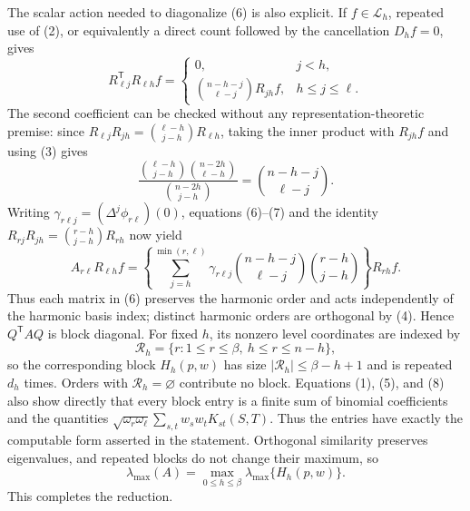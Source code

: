 The scalar action needed to diagonalize (6) is also explicit.  If \(f\in\mathcal L_h\), repeated use of (2), or equivalently a direct count followed by the cancellation \(D_hf=0\), gives
\[
R_{\ell j}^{\mathsf T}R_{\ell h}f
=\begin{cases}
0,&j<h,\\
\displaystyle\binom{n-h-j}{\ell-j}R_{jh}f,&h\le j\le\ell.
\end{cases}
\tag{7}
\]
The second coefficient can be checked without any representation-theoretic premise: since
\(R_{\ell j}R_{jh}=\binom{\ell-h}{j-h}R_{\ell h}\), taking the inner product with \(R_{jh}f\) and using (3) gives
\[
\frac{\binom{\ell-h}{j-h}\binom{n-2h}{\ell-h}}
{\binom{n-2h}{j-h}}
=\binom{n-h-j}{\ell-j}.
\]
Writing \(\gamma_{r\ell j}=(\Delta^j\phi_{r\ell})(0)\), equations (6)--(7) and the identity
\(R_{rj}R_{jh}=\binom{r-h}{j-h}R_{rh}\) now yield
\[
A_{r\ell}R_{\ell h}f
=\left\{
\sum_{j=h}^{\min(r,\ell)}
\gamma_{r\ell j}
\binom{n-h-j}{\ell-j}
\binom{r-h}{j-h}
\right\}R_{rh}f.
\tag{8}
\]
Thus each matrix in (6) preserves the harmonic order and acts independently of the harmonic basis index; distinct harmonic orders are orthogonal by (4).  Hence \(Q^{\mathsf T}AQ\) is block diagonal.  For fixed \(h\), its nonzero level coordinates are indexed by
\[
\mathcal R_h=\{r:1\le r\le\beta,\ h\le r\le n-h\},
\]
so the corresponding block \(H_h(p,w)\) has size \(|\mathcal R_h|\le\beta-h+1\) and is repeated \(d_h\) times.  Orders with \(\mathcal R_h=\varnothing\) contribute no block.  Equations (1), (5), and (8) also show directly that every block entry is a finite sum of binomial coefficients and the quantities
\(\sqrt{\omega_r\omega_\ell}\sum_{s,t}w_sw_tK_{st}(S,T)\).  Thus the entries have exactly the computable form asserted in the statement.  Orthogonal similarity preserves eigenvalues, and repeated blocks do not change their maximum, so
\[
\lambda_{\max}(A)
=\max_{0\le h\le\beta}\lambda_{\max}\{H_h(p,w)\}.
\]
This completes the reduction.
